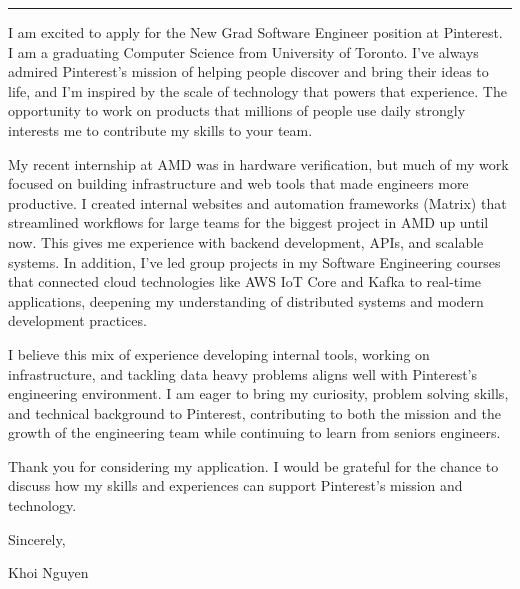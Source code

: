 \documentclass[
	12pt, %
]{resume} %
\begin{document}
    \medskip
    \hrule %
    \medskip

I am excited to apply for the New Grad Software Engineer position at Pinterest. I am a graduating Computer Science from University of Toronto. I've always admired Pinterest's mission of helping people discover and bring their ideas to life, and I'm inspired by the scale of technology that powers that experience. The opportunity to work on products that millions of people use daily strongly interests me to contribute my skills to your team.

My recent internship at AMD was in hardware verification, but much of my work focused on building infrastructure and web tools that made engineers more productive. I created internal websites and automation frameworks (Matrix) that streamlined workflows for large teams for the biggest project in AMD up until now. This gives me experience with backend development, APIs, and scalable systems. In addition, I've led group projects in my Software Engineering courses that connected cloud technologies like AWS IoT Core and Kafka to real-time applications, deepening my understanding of distributed systems and modern development practices.

I believe this mix of experience developing internal tools, working on infrastructure, and tackling data heavy problems aligns well with Pinterest's engineering environment. I am eager to bring my curiosity, problem solving skills, and technical background to Pinterest, contributing to both the mission and the growth of the engineering team while continuing to learn from seniors engineers.

Thank you for considering my application. I would be grateful for the chance to discuss how my skills and experiences can support Pinterest's mission and technology.

Sincerely,

Khoi Nguyen
\end{document}
